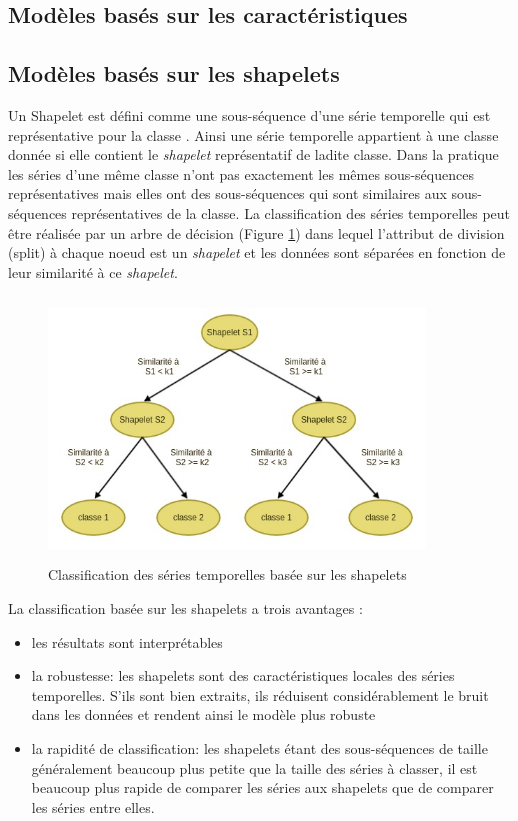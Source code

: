 \subsection{Modèles basés sur les caractéristiques}\label{sec:feature_based_model}

\subsection{Modèles basés sur les shapelets}\label{sec:shapelet_based_model}
Un Shapelet est défini comme une sous-séquence d'une série temporelle qui est représentative pour la classe \citep{ye2009time}. Ainsi une série temporelle appartient à une classe donnée si elle contient le \textit{shapelet} représentatif de ladite classe. Dans la pratique les séries d'une même classe n'ont pas exactement les mêmes sous-séquences représentatives mais elles ont des sous-séquences qui sont similaires aux sous-séquences représentatives de la classe. 
La classification des séries temporelles peut être réalisée par un arbre de décision (Figure \ref{fig:shapelet_based_dt}) dans lequel l'attribut de division (split) à chaque noeud est un \textit{shapelet} et les données sont séparées en fonction de leur similarité à ce \textit{shapelet}.

\begin{figure}[!h]
    \centering
    \includegraphics[width=10cm,height=7cm]{report/figures/shapelet-based-tree.jpg}
    \caption{Classification des séries temporelles basée sur les shapelets}
    \label{fig:shapelet_based_dt}
\end{figure}

La classification basée sur les shapelets a trois avantages \citep{ye2009time}:
\begin{itemize}
    \item les résultats sont interprétables 
    \item la robustesse: les shapelets sont des caractéristiques locales des séries temporelles. S'ils sont bien extraits, ils réduisent considérablement le bruit dans les données et rendent ainsi le modèle plus robuste
    \item la rapidité de classification: les shapelets étant des sous-séquences de taille généralement beaucoup plus petite que la taille des séries à classer, il est beaucoup plus rapide de comparer les séries aux shapelets que de comparer les séries entre elles.
\end{itemize}


